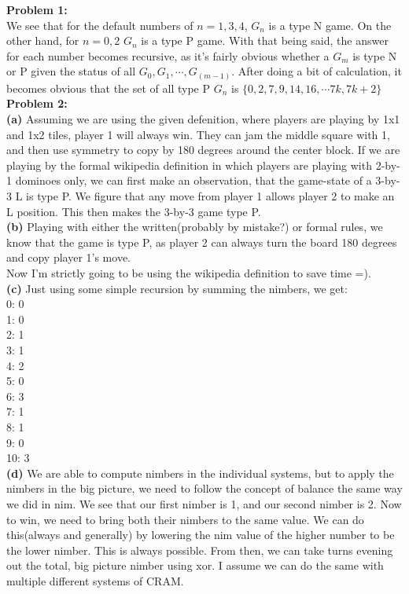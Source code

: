 \documentclass[12pt]{article}
\begin{document}
\noindent
\textbf{Problem 1:}\\

We see that for the default numbers of $n = 1, 3, 4$, $G_n$ is a type N game. On the other hand, 
for $n = 0, 2$ $G_n$ is a type P game. With that being said, the answer for each number becomes recursive, as it's
fairly obvious whether a $G_m$ is type N or P given the status of all $G_0, G_1, \cdots, G_(m-1)$. 
After doing a bit of calculation, it becomes obvious that the set of all type P $G_n$ is $\{0,2,7,9,14,16, \cdots 7k, 7k+2\}$ \\

\noindent
\textbf{Problem 2:}\\

\textbf{(a) }Assuming we are using the given defenition, where players are playing by 1x1 and 1x2 tiles,
player 1 will always win. They can jam the middle square with 1, and then use symmetry to copy by 180 degrees around the 
center block. If we are playing by the formal wikipedia definition in which players are playing with
2-by-1 dominoes only, we can first make an observation, that the game-state of a
3-by-3 L is type P. We figure that any move from player 1 allows player 2 to make an L position. 
This then makes the 3-by-3 game type P. \\

\textbf{(b) } Playing with either the written(probably by mistake?) or formal rules, we know that the game is type P,
as player 2 can always turn the board 180 degrees and copy player 1's move.\\

Now I'm strictly going to be using the wikipedia definition to save time =).\\

\textbf{(c) } Just using some simple recursion by summing the nimbers, we get: \\
0: 0\\ 
1: 0\\
2: 1\\
3: 1\\
4: 2\\
5: 0\\
6: 3\\
7: 1\\
8: 1\\
9: 0\\
10: 3\\

\textbf{(d) } We are able to compute nimbers in the individual systems, 
but to apply the nimbers in the big picture, we need to follow the concept of balance the same way we did in nim. We see that 
our first nimber is 1, and our second nimber is 2. Now to win, we need to bring both their nimbers to the same value. We can do this(always and generally) by lowering the nim value of the higher number 
to be the lower nimber. This is always possible. From then, we can take turns evening out the total, big picture nimber using xor. I assume we can do the same with multiple different systems of CRAM.
\end{document}
